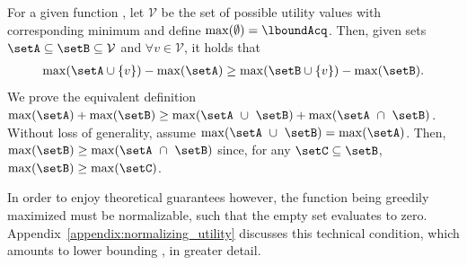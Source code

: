 For a given function \acq{}, let \(\mathcal{V}\) be the set of possible utility values with  corresponding minimum \lboundAcq{} and define \(\max(\emptyset) = \lboundAcq\). Then, given sets \(\setA \subseteq \setB \subseteq \mathcal{V}\) and \(\forall v \in \mathcal{V}\), it holds that
\begin{align}
\max(\setA \cup \{v\}) - \max(\setA) \ge \max(\setB \cup \{v\}) - \max(\setB).
\label{eq:max_submodularity}
\end{align}
 We prove the equivalent definition \(\max(\setA) + \max(\setB) \ge \max(\setA~\cup~\setB) + \max(\setA~\cap~\setB)\). Without loss of generality, assume \(\max(\setA~\cup~\setB) = \max(\setA)\). Then, \(\max(\setB) \ge \max(\setA~\cap~\setB)\) since, for any \(\setC \subseteq \setB\), \(\max(\setB) \ge \max(\setC)\). 
%

In order to enjoy theoretical guarantees however, the function being greedily maximized must be normalizable, such that the empty set evaluates to zero. Appendix~\ref{appendix:normalizing_utility} discusses this technical condition, which amounts to lower bounding \lboundAcq{}, in greater detail.



